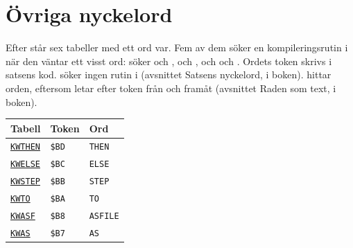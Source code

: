 \section{Övriga nyckelord}
\noindent Efter  står sex tabeller med ett ord
var. Fem av dem söker en kompileringsrutin i när den väntar ett visst ord:
 söker  och ,   och ,
och  och  . Ordets token skrivs i satsens kod.
 söker ingen rutin i (avsnittet Satsens nyckelord,
i boken).  hittar orden, eftersom
 letar efter token från  och framåt (avsnittet
Raden som text, i boken).\par\medskip
\TabNeed{30mm}
\begin{small}\setlength{\LTleft}{0pt}\setlength{\LTright}{\fill}\begin{longtable}{@{}l l l@{}}
\textbf{Tabell} & \textbf{Token} & \textbf{Ord}\\\hline\endhead
\hyperlink{l:KWTHEN}{\texttt{KWTHEN}} & \texttt{\$BD} & \texttt{THEN}\\
\hyperlink{l:KWELSE}{\texttt{KWELSE}} & \texttt{\$BC} & \texttt{ELSE}\\
\hyperlink{l:KWSTEP}{\texttt{KWSTEP}} & \texttt{\$BB} & \texttt{STEP}\\
\hyperlink{l:KWTO}{\texttt{KWTO}} & \texttt{\$BA} & \texttt{TO}\\
\hyperlink{l:KWASF}{\texttt{KWASF}} & \texttt{\$B8} & \texttt{ASFILE}\\
\hyperlink{l:KWAS}{\texttt{KWAS}} & \texttt{\$B7} & \texttt{AS}\\
\end{longtable}\end{small}
